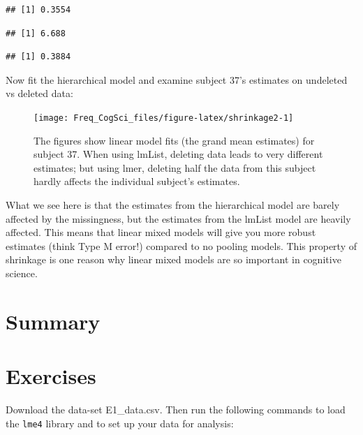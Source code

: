 \documentclass[12pt,]{krantz}
\newenvironment{Shaded}{\begin{snugshade}}{\end{snugshade}}
\newcommand{\CommentTok}[1]{\textcolor[rgb]{0.56,0.35,0.01}{\textit{#1}}}
\newcommand{\DataTypeTok}[1]{\textcolor[rgb]{0.13,0.29,0.53}{#1}}
\newcommand{\DecValTok}[1]{\textcolor[rgb]{0.00,0.00,0.81}{#1}}
\newcommand{\KeywordTok}[1]{\textcolor[rgb]{0.13,0.29,0.53}{\textbf{#1}}}
\newcommand{\NormalTok}[1]{#1}
\newcommand{\OperatorTok}[1]{\textcolor[rgb]{0.81,0.36,0.00}{\textbf{#1}}}
\newcommand{\OtherTok}[1]{\textcolor[rgb]{0.56,0.35,0.01}{#1}}
\newcommand{\StringTok}[1]{\textcolor[rgb]{0.31,0.60,0.02}{#1}}
\begin{document}
\begin{verbatim}
## [1] 0.3554
\end{verbatim}

\begin{verbatim}
## [1] 6.688
\end{verbatim}

\begin{verbatim}
## [1] 0.3884
\end{verbatim}

Now fit the hierarchical model and examine subject 37's estimates on undeleted vs deleted data:

\begin{figure}
\texttt{[image: Freq\_CogSci\_files/figure-latex/shrinkage2-1]} \caption{The figures show linear model fits (the grand mean estimates) for subject 37. When using lmList, deleting data leads to very different estimates; but using lmer, deleting half the data from this subject hardly affects the individual subject's estimates.}\label{fig:shrinkage2}
\end{figure}

What we see here is that the estimates from the hierarchical model are barely affected by the missingness, but the estimates from the lmList model are heavily affected.
This means that linear mixed models will give you more robust estimates (think Type M error!) compared to no pooling models. This property of shrinkage is one reason why linear mixed models are so important in cognitive science.

\hypertarget{summary}{%
\section{Summary}\label{summary}}

\hypertarget{sec:LMExercises}{%
\section{Exercises}\label{sec:LMExercises}}

Download the data-set E1\_data.csv. Then run the following commands to load the \texttt{lme4} library and to set up your data for analysis:

\begin{Shaded}
\end{Shaded}
\end{document}
